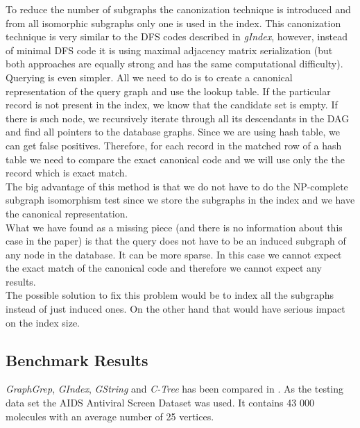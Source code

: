 To reduce the number of subgraphs the canonization technique is introduced and from all isomorphic subgraphs only one is used in the index. This canonization technique is very similar to the DFS codes described in \textit{gIndex}, however, instead of minimal DFS code it is using maximal adjacency matrix serialization (but both approaches are equally strong and has the same computational difficulty).\\

Querying is even simpler. All we need to do is to create a canonical representation of the query graph and use the lookup table. If the particular record is not present in the index, we know that the candidate set is empty. If there is such node, we recursively iterate through all its descendants in the DAG and find all pointers to the database graphs. Since we are using hash table, we can get false positives. Therefore, for each record in the matched row of a hash table we need to compare the exact canonical code and we will use only the the record which is exact match.\\

The big advantage of this method is that we do not have to do the NP-complete subgraph isomorphism test since we store the subgraphs in the index and we have the canonical representation.\\

What we have found as a missing piece (and there is no information about this case in the paper) is that the query does not have to be an induced subgraph of any node in the database. It can be more sparse. In this case we cannot expect the exact match of the canonical code and therefore we cannot expect any results.\\

The possible solution to fix this problem would be to index all the subgraphs instead of just induced ones. On the other hand that would have serious impact on the index size.

\subsection{Benchmark Results}

\textit{GraphGrep}, \textit{GIndex}, \textit{GString} and \textit{C-Tree} has been compared in \cite{GString}. As the testing data set the AIDS Antiviral Screen Dataset \cite{AIDS} was used. It contains 43 000 molecules with an average number of 25 vertices.\\


